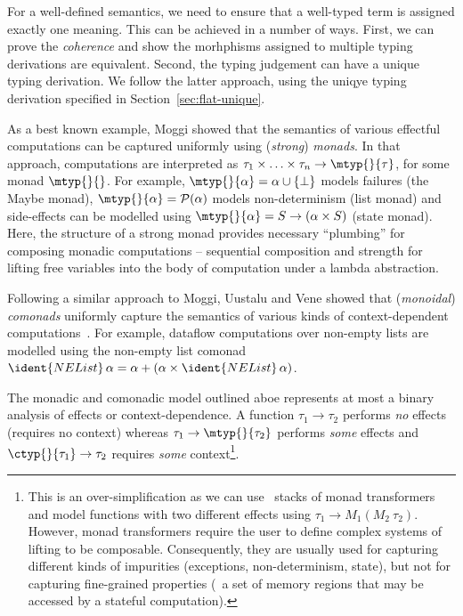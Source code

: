 For a well-defined semantics, we need to ensure that a well-typed term is assigned exactly one
meaning. This can be achieved in a number of ways. First, we can prove the \emph{coherence}
\cite{semantics-bltres} and show the morhphisms assigned to multiple typing derivations are equivalent.
Second, the typing judgement can have a unique typing derivation. We follow the latter approach,
using the uniqye typing derivation specified in Section~\ref{sec:flat-unique}.

As a best known example, Moggi \cite{monad-notions} showed that the semantics of various effectful
computations can be captured uniformly using (\emph{strong}) \emph{monads}. In that
approach, computations are interpreted as $\tau_1 \times \ldots \times \tau_n \rightarrow \mtyp{}{\tau}$,
for some monad $\mtyp{}{}$. For example, $\mtyp{}{\alpha} = \alpha \cup \{ \bot \}$ models
failures (the Maybe monad), $\mtyp{}{\alpha} = \mathcal{P}(\alpha)$ models non-determinism (list
monad) and side-effects can be modelled using $\mtyp{}{\alpha} = S \rightarrow (\alpha \times S)$
(state monad). Here, the structure of a strong monad provides necessary ``plumbing'' for composing
monadic computations -- sequential composition and strength for lifting free variables into the
body of computation under a lambda abstraction.

Following a similar approach to Moggi, Uustalu and Vene \cite{comonads-notions} showed that
(\emph{monoidal}) \emph{comonads} uniformly capture the semantics of various kinds of context-dependent
computations~\cite{comonads-notions}. For example, dataflow computations over non-empty lists
are modelled using the non-empty list comonad $\ident{NEList}\,\alpha = \alpha + (\alpha \times \ident{NEList}\,\alpha)$.

The monadic and comonadic model outlined aboe represents at most a binary analysis of effects or
context-dependence. A function $\tau_1 \rightarrow \tau_2$ performs \emph{no} effects (requires no
context) whereas $\tau_1 \rightarrow \mtyp{}{\tau_2}$ performs \emph{some} effects and
$\ctyp{}{\tau_1} \rightarrow \tau_2$ requires \emph{some} context\footnote{This is an
over-simplification as we can use \eg~stacks of monad transformers and model functions with
two different effects using $\tau_1 \rightarrow M_1(M_2~\tau_2)$. However, monad transformers
require the user to define complex systems of lifting to be composable. Consequently, they are usually used
for capturing different kinds of impurities (exceptions, non-determinism, state), but not for
capturing fine-grained properties (\eg~a set of memory regions that may be accessed by a
stateful computation).}.

